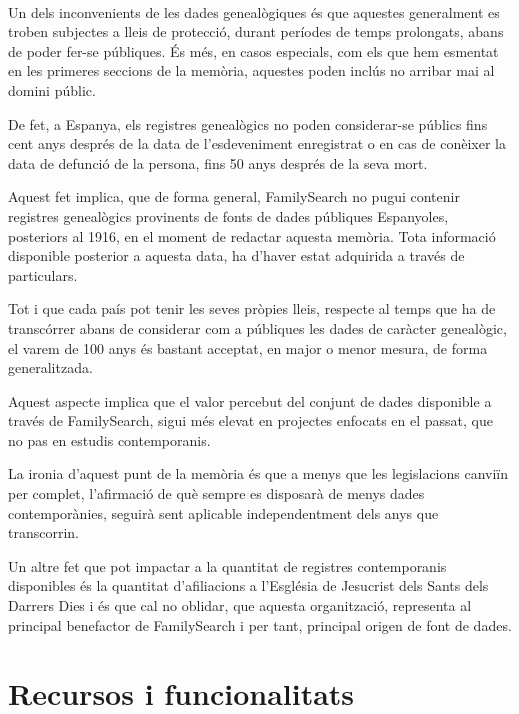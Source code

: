     \paragraph{}
    Un dels inconvenients de les dades genealògiques és que aquestes generalment es troben subjectes a lleis de protecció, durant períodes de temps prolongats, abans de poder fer-se públiques. És més, en casos especials, com els que hem esmentat en les primeres seccions de la memòria, aquestes poden inclús no arribar mai al domini públic.

    De fet, a Espanya, els registres genealògics no poden considerar-se públics fins cent anys després de la data de l'esdeveniment enregistrat o en cas de conèixer la data de defunció de la persona, fins 50 anys després de la seva mort.

    Aquest fet implica, que de forma general, FamilySearch no pugui contenir re\-gis\-tres genealògics provinents de fonts de dades públiques Espanyoles, posteriors al 1916, en el moment de redactar aquesta memòria. Tota informació disponible posterior a aquesta data, ha d'haver estat adquirida a través de particulars.

    Tot i que cada país pot tenir les seves pròpies lleis, respecte al temps que ha de transcórrer abans de considerar com a públiques les dades de caràcter genealògic, el varem de 100 anys és bastant acceptat, en major o menor mesura, de forma generalitzada.

    Aquest aspecte implica que el valor percebut del conjunt de dades disponible a través de FamilySearch, sigui més elevat en projectes enfocats en el passat, que no pas en estudis contemporanis.

    La ironia d'aquest punt de la memòria és que a menys que les legislacions canviïn per complet, l'afirmació de què sempre es disposarà de menys dades contemporànies, seguirà sent aplicable independentment dels anys que transcorrin.

    Un altre fet que pot impactar a la quantitat de registres contemporanis disponibles és la quantitat d'afiliacions a l'Església de Jesucrist dels Sants dels Darrers Dies i és que cal no oblidar, que aquesta organització, representa al principal benefactor de FamilySearch i per tant, principal origen de font de dades.


\section{Recursos i funcionalitats}

